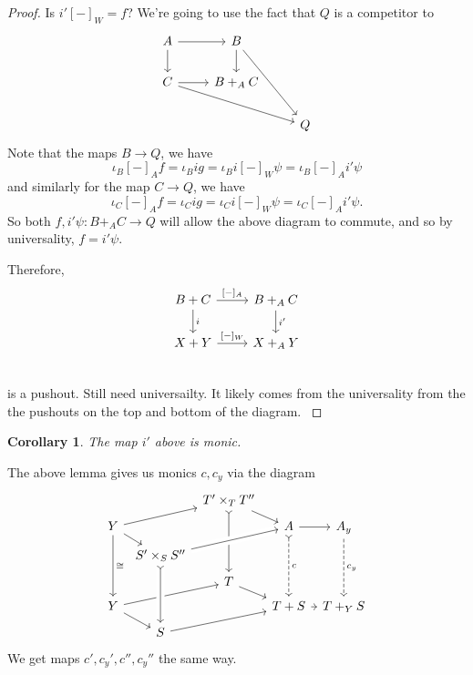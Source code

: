 \documentclass[12pt]{article}
\newcommand{\from}{\colon}
\renewcommand{\(}{\left(}
\renewcommand{\)}{\right)}
\renewcommand{\{}{\left\lbrace}
\renewcommand{\}}{\right\rbrace}
\newtheorem*{cor}{Corollary}
\theoremstyle{remark}
\theoremstyle{definition}
\begin{document}
\begin{proof}
 	Is $i'[-]_W=f$? We're going to use the fact that $Q$ is a competitor to
 	\[
 	\begin{tikzcd}
 	{A} \ar[r] \ar[d] &
 	{B} \ar[d] \ar[ddr]&
 	{} \\
 	{C} \ar[r] \ar[drr]&
 	{B+_AC} &
 	{} \\
 	{} &
 	{} &
 	{Q}
 	\end{tikzcd}
 	\]
 	Note that the maps $B \to Q$, we have 
 	\[
 	\iota_B [-]_A f 
 	= \iota_B i g 
 	= \iota_B i [-]_W \psi
 	= \iota_B [-]_A i' \psi
 	\]
 	and similarly for the map $C \to Q$, we have
 	\[
 	\iota_C [-]_A f 
 	= \iota_C i g 
 	= \iota_C i [-]_W \psi
 	= \iota_C [-]_A i' \psi.
 	\]
 	So both $f,i' \psi \from B+_AC \to Q$ will allow the above diagram to commute, and so 
 	by universality, $f=i'\psi$.  
 	
 	Therefore, 
 	\[
 	\begin{tikzcd}
 	{B+C} \ar[r,"{[-]_A}"] \ar[d,"i"] &
 	{B+_AC} \ar[d,"i'"]\\
 	{X+Y} \ar[r,"{[-]_W}"] &
 	{X+_AY} \\
 	\end{tikzcd}
 	\]
 	is a pushout. 	{\color{red} Still need universailty.  It likely comes from the universality from the the pushouts on the top and bottom of the diagram. }
 \end{proof}
 
 \begin{cor}
 	The map $i'$ above is monic.
 \end{cor}
 
 The above lemma gives us monics $c,c_y$ via the diagram
 \[
 \begin{tikzcd}[column sep=.5em,row sep=.5em]
 {} &
 {} &
 {T'\times_TT''} \ar[dr] \ar[ddd,rightarrowtail]&
 {} &
 {} \\
 {Y} \ar[rru] \ar[rd] \ar[ddd,"\cong"]&
 {} &
 {} &
 {A} \ar[ddd,dashed,rightarrowtail, "c"] \ar[r] &
 {A_y} \ar[ddd,dashed,"c_y"]\\
 {} &
 {S'\times_SS''} \ar[rru,crossing over] &
 {} &
 {} &
 {} \\
 {} &
 {} &
 {T} \ar[dr]&
 {} &
 {} \\
 {Y} \ar[rru] \ar[rd]&
 {} &
 {} &
 {T+S} \ar[r]&
 {T+_YS} \\
 {} &
 {S} \ar[rru] &
 {} &
 {} &
 {} 
 \ar[from=3-2,to=6-2,rightarrowtail,crossing over]
 \end{tikzcd}
 \]
 We get maps $c',c_y',c'',c_y''$ the same way.
 
\end{document}
